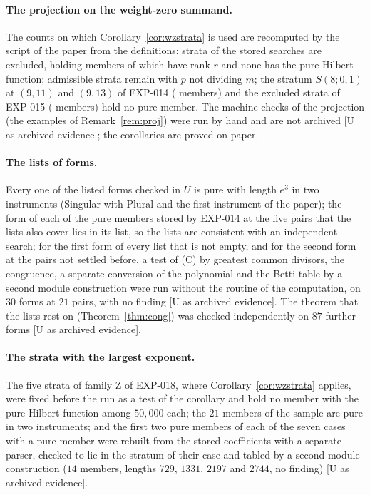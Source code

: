 \documentclass[11pt]{article}
\theoremstyle{definition}
\theoremstyle{remark}
\newcommand{\EXP}[1]{\mbox{EXP-#1}}
\begin{document}
\paragraph{The projection on the weight-zero summand.} The counts on which Corollary~\ref{cor:wzstrata} is used are recomputed by the script of the paper from the definitions: \nwzExcluded{} strata of the stored searches are excluded, holding \nwzExcludedMembers{} members of which \nwzExcludedRankR{} have rank $r$ and none has the pure Hilbert function; \nwzExcludedAdm{} admissible strata remain with $p$ not dividing $m$; the stratum $S(8;0,1)$ at $(9,11)$ and $(9,13)$ of \EXP{014} (\nwzExcludedFourteen{} members) and the \nwzExcludedFifteen{} excluded strata of \EXP{015} (\nwzExcludedFifteenMembers{} members) hold no pure member. The machine checks of the projection (the examples of Remark~\ref{rem:proj}) were run by hand and are not archived [U as archived evidence]; the corollaries are proved on paper.

\paragraph{The lists of forms.} Every one of the \nlstVerified{} listed forms checked in $U$ is pure with length $e^3$ in two instruments (Singular with Plural and the first instrument of the paper); the form of each of the \nlstEFourteenMembers{} pure members stored by \EXP{014} at the five pairs that the lists also cover lies in its list, so the lists are consistent with an independent search; for the first form of every list that is not empty, and for the second form at the pairs not settled before, a test of (C) by greatest common divisors, the congruence, a separate conversion of the polynomial and the Betti table by a second module construction were run without the routine of the computation, on $30$ forms at $21$ pairs, with no finding [U as archived evidence]. The theorem that the lists rest on (Theorem~\ref{thm:cong}) was checked independently on $87$ further forms [U as archived evidence].

\paragraph{The strata with the largest exponent.} The five strata of family Z of \EXP{018}, where Corollary~\ref{cor:wzstrata} applies, were fixed before the run as a test of the corollary and hold no member with the pure Hilbert function among $50{,}000$ each; the $21$ members of the sample are pure in two instruments; and the first two pure members of each of the seven cases with a pure member were rebuilt from the stored coefficients with a separate parser, checked to lie in the stratum of their case and tabled by a second module construction ($14$ members, lengths $729$, $1331$, $2197$ and $2744$, no finding) [U as archived evidence].
\end{document}
